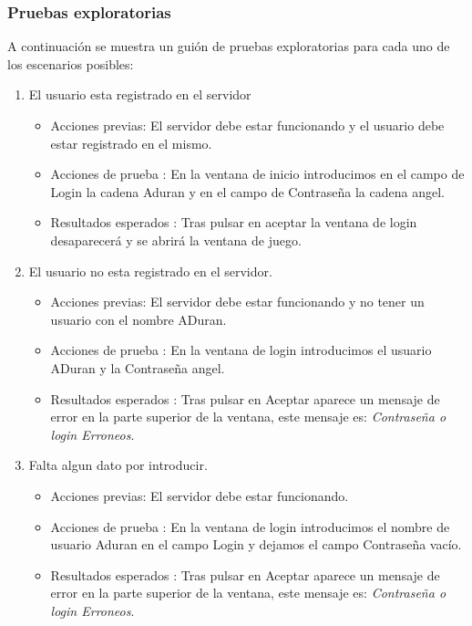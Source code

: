 \subsubsection{Pruebas exploratorias}

A continuación se muestra un guión de pruebas exploratorias para cada uno de los escenarios posibles:
\begin{enumerate}
\item El usuario esta registrado en el servidor
	\begin{itemize}
	\item Acciones previas: El servidor debe estar funcionando y el usuario debe estar registrado en el mismo.
	\item Acciones de prueba : En la ventana de inicio introducimos en el campo de Login la cadena Aduran y en el campo de Contraseña la cadena angel.
	\item Resultados esperados : Tras pulsar en aceptar la ventana de login desaparecerá y se abrirá la ventana de juego.
	\end{itemize}
\item El usuario no esta registrado en el servidor.
	\begin{itemize}
	\item Acciones previas: El servidor debe estar funcionando y no tener un usuario con el nombre ADuran.
	\item Acciones de prueba : En la ventana de login introducimos el usuario ADuran y la Contraseña angel.
	\item Resultados esperados : Tras pulsar en Aceptar aparece un mensaje de error en la parte superior de la ventana, este mensaje es: \emph {Contraseña o login Erroneos}.
	\end{itemize}

\item Falta algun dato por introducir.
	\begin{itemize}
	\item Acciones previas: El servidor debe estar funcionando.
	\item Acciones de prueba : En la ventana de login introducimos el nombre de usuario Aduran en el campo Login y dejamos el campo Contraseña vacío.
	\item Resultados esperados : Tras pulsar en Aceptar aparece un mensaje de error en la parte superior de la ventana, este mensaje es: \emph {Contraseña o login Erroneos}.
	\end{itemize}
\end{enumerate}
